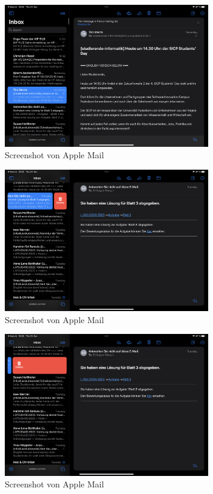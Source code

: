 \documentclass[a4paper,12pt]{article}
\begin{document}
\begin{figure}[h]
  \centering
  \includegraphics[width=0.8\textwidth]{IMG_0094.jpg}
  \caption{Screenshot von Apple Mail}
\end{figure}
\begin{figure}[h]
  \centering
  \includegraphics[width=0.8\textwidth]{IMG_0095.jpg}
  \caption{Screenshot von Apple Mail}
\end{figure}
\begin{figure}[h]
  \centering
  \includegraphics[width=0.8\textwidth]{IMG_0096.jpg}
  \caption{Screenshot von Apple Mail}
\end{figure}
\end{document}
